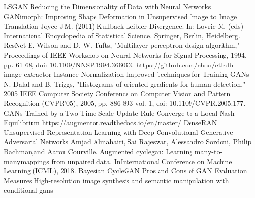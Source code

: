 \documentclass[12pt]{report}
\begin{document}
\begin{thebibliography}{9}
	 LSGAN
	 Reducing the Dimensionality of Data with Neural Networks
	 GANimorph: Improving Shape Deformation in Unsupervised Image to Image Translation
	 Joyce J.M. (2011) Kullback-Leibler Divergence. In: Lovric M. (eds) International Encyclopedia of Statistical Science. Springer, Berlin, Heidelberg.
	 ResNet
	 E. Wilson and D. W. Tufts, "Multilayer perceptron design algorithm," Proceedings of IEEE Workshop on Neural Networks for Signal Processing, 1994, pp. 61-68, doi: 10.1109/NNSP.1994.366063.
	 https://github.com/choo/etlcdb-image-extractor
	 Instance Normalization
	 Improved Techniques for Training GANs
	 N. Dalal and B. Triggs, "Histograms of oriented gradients for human detection," 2005 IEEE Computer Society Conference on Computer Vision and Pattern Recognition (CVPR'05), 2005, pp. 886-893 vol. 1, doi: 10.1109/CVPR.2005.177.
	 GANs Trained by a Two Time-Scale Update Rule Converge to a Local Nash Equilibrium
	 https://augmentor.readthedocs.io/en/master/
	 DenseRAN
	 Unsupervised Representation Learning with Deep Convolutional Generative Adversarial Networks
	 Amjad  Almahairi,  Sai  Rajeswar,  Alessandro  Sordoni,  Philip  Bachman,and  Aaron  Courville.    Augmented  cyclegan:  Learning  many-to-manymappings from unpaired data.  InInternational Conference on Machine Learning (ICML), 2018.
	 Bayesian CycleGAN
	 Pros and Cons of GAN Evaluation Measures
	 High-resolution image synthesis and semantic manipulation with conditional gans
\end{thebibliography}
\end{document}
